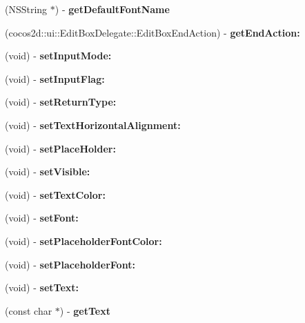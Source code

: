\begin{DoxyCompactItemize}
(N\+S\+String $\ast$) -\/ {\bfseries get\+Default\+Font\+Name}
\item 
\mbox{\label{interfaceUIEditBoxImplMac_a442fb18660f1521733ce2e0def645d74}} 
(cocos2d\+::ui\+::\+Edit\+Box\+Delegate\+::\+Edit\+Box\+End\+Action) -\/ {\bfseries get\+End\+Action\+:}
\item 
\mbox{\label{interfaceUIEditBoxImplMac_a9069feb274630652618088d6f19a7fa0}} 
(void) -\/ {\bfseries set\+Input\+Mode\+:}
\item 
\mbox{\label{interfaceUIEditBoxImplMac_a5935cb8c067653c08782d900647bc4cb}} 
(void) -\/ {\bfseries set\+Input\+Flag\+:}
\item 
\mbox{\label{interfaceUIEditBoxImplMac_a8a748cfd94cbdb0593b72209db137cca}} 
(void) -\/ {\bfseries set\+Return\+Type\+:}
\item 
\mbox{\label{interfaceUIEditBoxImplMac_a055d2b7197778d9355b6f20bc2b720c3}} 
(void) -\/ {\bfseries set\+Text\+Horizontal\+Alignment\+:}
\item 
\mbox{\label{interfaceUIEditBoxImplMac_a0d7dfd53836a33803356ea2e2f9cb1a3}} 
(void) -\/ {\bfseries set\+Place\+Holder\+:}
\item 
\mbox{\label{interfaceUIEditBoxImplMac_a1e16931cb5ec21c86bf221bfb69410e0}} 
(void) -\/ {\bfseries set\+Visible\+:}
\item 
\mbox{\label{interfaceUIEditBoxImplMac_a3588ab8439f14f9adca5fbd3f91ae8d3}} 
(void) -\/ {\bfseries set\+Text\+Color\+:}
\item 
\mbox{\label{interfaceUIEditBoxImplMac_a8463b4cc8f5955086cc35380291cfe13}} 
(void) -\/ {\bfseries set\+Font\+:}
\item 
\mbox{\label{interfaceUIEditBoxImplMac_a899dce5043d6589056d4b795b93db655}} 
(void) -\/ {\bfseries set\+Placeholder\+Font\+Color\+:}
\item 
\mbox{\label{interfaceUIEditBoxImplMac_ae1f57f6acf40292dfbe59dbd24cf8c16}} 
(void) -\/ {\bfseries set\+Placeholder\+Font\+:}
\item 
\mbox{\label{interfaceUIEditBoxImplMac_acd07c8cea14fdbe314b2499544caee28}} 
(void) -\/ {\bfseries set\+Text\+:}
\item 
\mbox{\label{interfaceUIEditBoxImplMac_a946372cd653f7f97e8695b00da7a9670}} 
(const char $\ast$) -\/ {\bfseries get\+Text}
\end{DoxyCompactItemize}
